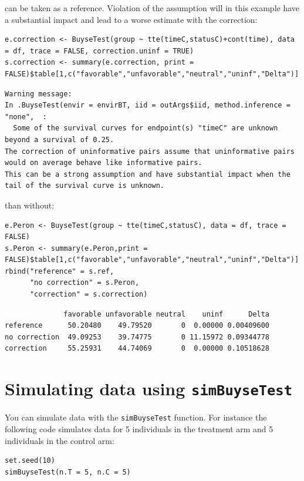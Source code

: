 \documentclass[12pt]{article}
\begin{document}
can be taken as a reference. Violation of the assumption will in this
example have a substantial impact and lead to a worse estimate with
the correction:
\lstset{language=r,label= ,caption= ,captionpos=b,numbers=none}
\begin{lstlisting}
e.correction <- BuyseTest(group ~ tte(timeC,statusC)+cont(time), data = df, trace = FALSE, correction.uninf = TRUE)
s.correction <- summary(e.correction, print = FALSE)$table[1,c("favorable","unfavorable","neutral","uninf","Delta")]
\end{lstlisting}

\begin{verbatim}
Warning message:
In .BuyseTest(envir = envirBT, iid = outArgs$iid, method.inference = "none",  :
  Some of the survival curves for endpoint(s) "timeC" are unknown beyond a survival of 0.25.
The correction of uninformative pairs assume that uninformative pairs would on average behave like informative pairs. 
This can be a strong assumption and have substantial impact when the tail of the survival curve is unknown.
\end{verbatim}


than without:
\lstset{language=r,label= ,caption= ,captionpos=b,numbers=none}
\begin{lstlisting}
e.Peron <- BuyseTest(group ~ tte(timeC,statusC), data = df, trace = FALSE)
s.Peron <- summary(e.Peron,print = FALSE)$table[1,c("favorable","unfavorable","neutral","uninf","Delta")]
rbind("reference" = s.ref,
      "no correction" = s.Peron,
      "correction" = s.correction)
\end{lstlisting}
\begin{verbatim}
              favorable unfavorable neutral    uninf      Delta
reference      50.20480    49.79520       0  0.00000 0.00409600
no correction  49.09253    39.74775       0 11.15972 0.09344778
correction     55.25931    44.74069       0  0.00000 0.10518628
\end{verbatim}


\clearpage

\section{Simulating data using \texttt{simBuyseTest}}
\label{sec:orgd6b4eb2}
You can simulate data with the \texttt{simBuyseTest} function. For instance
the following code simulates data for 5 individuals in the treatment
arm and 5 individuals in the control arm:
\lstset{language=r,label= ,caption= ,captionpos=b,numbers=none}
\begin{lstlisting}
set.seed(10)
simBuyseTest(n.T = 5, n.C = 5)
\end{lstlisting}
\end{document}
